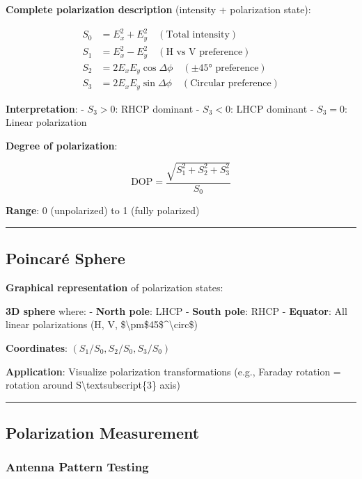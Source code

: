 \textbf{Complete polarization description} (intensity + polarization
state):

\[
\begin{aligned}
S_0 &= E_x^2 + E_y^2 \quad (\text{Total intensity}) \\
S_1 &= E_x^2 - E_y^2 \quad (\text{H vs V preference}) \\
S_2 &= 2E_xE_y\cos\Delta\phi \quad (\text{±45° preference}) \\
S_3 &= 2E_xE_y\sin\Delta\phi \quad (\text{Circular preference})
\end{aligned}
\]

\textbf{Interpretation}: - \(S_3 > 0\): RHCP dominant - \(S_3 < 0\):
LHCP dominant - \(S_3 = 0\): Linear polarization

\textbf{Degree of polarization}:

\[
\text{DOP} = \frac{\sqrt{S_1^2 + S_2^2 + S_3^2}}{S_0}
\]

\textbf{Range}: 0 (unpolarized) to 1 (fully polarized)

\begin{center}\rule{0.5\linewidth}{0.5pt}\end{center}

\subsection{Poincaré Sphere}\label{poincaruxe9-sphere}

\textbf{Graphical representation} of polarization states:

\textbf{3D sphere} where: - \textbf{North pole}: LHCP - \textbf{South
pole}: RHCP - \textbf{Equator}: All linear polarizations (H, V,
\$\textbackslash pm\$45\$\^{}\textbackslash circ\$)

\textbf{Coordinates}: \((S_1/S_0, S_2/S_0, S_3/S_0)\)

\textbf{Application}: Visualize polarization transformations (e.g.,
Faraday rotation = rotation around S\textbackslash textsubscript\{3\}
axis)

\begin{center}\rule{0.5\linewidth}{0.5pt}\end{center}

\subsection{Polarization Measurement}\label{polarization-measurement}

\subsubsection{Antenna Pattern Testing}\label{antenna-pattern-testing}

